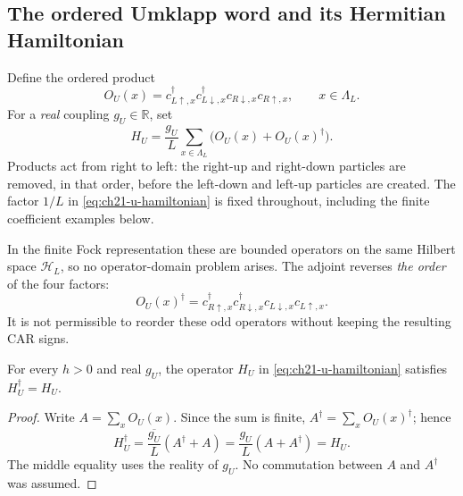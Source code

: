 \subsection*{The ordered Umklapp word and its Hermitian Hamiltonian}

\begin{definition}
\label{def:ch21-u-word}
Define the ordered product
\begin{equation}
  O_U(x)=c_{L\uparrow,x}^{\dagger}
         c_{L\downarrow,x}^{\dagger}
         c_{R\downarrow,x}c_{R\uparrow,x},
       \qquad x\in\Lambda_L.
  \label{eq:ch21-u-word}
\end{equation}
For a \emph{real} coupling \(g_U\in\mathbb R\), set
\begin{equation}
 H_U=\frac{g_U}{L}\sum_{x\in\Lambda_L}
           \bigl(O_U(x)+O_U(x)^\dagger\bigr).
 \label{eq:ch21-u-hamiltonian}
\end{equation}
Products act from right to left: the right-up and right-down particles
are removed, in that order, before the left-down and left-up particles are
created.  The factor \(1/L\) in \eqref{eq:ch21-u-hamiltonian} is fixed
throughout, including the finite coefficient examples below.
\end{definition}

In the finite Fock representation these are bounded operators on the
same Hilbert space \(\mathcal H_L\), so no operator-domain problem arises.
The adjoint reverses \emph{the order} of the four factors:
\begin{equation}
 O_U(x)^\dagger
  =c_{R\uparrow,x}^\dagger c_{R\downarrow,x}^\dagger
    c_{L\downarrow,x}c_{L\uparrow,x}.
 \label{eq:ch21-u-adjoint}
\end{equation}
It is not permissible to reorder these odd operators without keeping
the resulting CAR signs.

\begin{proposition}
\label{prop:ch21-u-selfadjoint}
For every \(h>0\) and real \(g_U\), the operator \(H_U\) in
\eqref{eq:ch21-u-hamiltonian} satisfies \(H_U^\dagger=H_U\).
\end{proposition}
\begin{proof}
Write \(A=\sum_xO_U(x)\).  Since the sum is finite,
\(A^\dagger=\sum_xO_U(x)^\dagger\); hence
\[
 H_U^\dagger
 =\overline{\frac{g_U}{L}}(A^\dagger+A)
 =\frac{g_U}{L}(A+A^\dagger)=H_U.
\]
The middle equality uses the reality of \(g_U\).  No commutation
between \(A\) and \(A^\dagger\) was assumed.
\end{proof}

